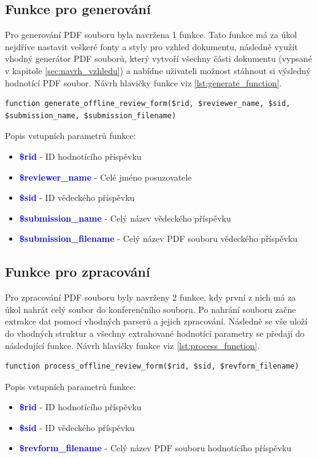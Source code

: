\subsection{Funkce pro generování}
Pro generování PDF souboru byla navržena 1 funkce. Tato funkce má za úkol nejdříve nastavit veškeré fonty a styly pro vzhled dokumentu, následně využít vhodný generátor PDF souborů, který vytvoří všechny části dokumentu (vypsané v kapitole \ref{sec:navrh_vzhledu}) a nabídne uživateli možnost stáhnout si výsledný hodnotící PDF soubor. Návrh hlavičky funkce viz \ref{lst:generate_function}.

\lstset{style=phpstyle}
\begin{lstlisting}[caption = {Návrh hlavičky funkce pro generování PDF souboru}, label = {lst:generate_function}, captionpos=b]
function generate_offline_review_form($rid, $reviewer_name, $sid, $submission_name, $submission_filename)
\end{lstlisting}
Popis vstupních parametrů funkce:
\begin{itemize}
	\item\textcolor{blue}{\textbf{\$rid}} - ID hodnotícího příspěvku
	\item\textcolor{blue}{\textbf{\$reviewer\_name}} - Celé jméno posuzovatele
	\item\textcolor{blue}{\textbf{\$sid}} - ID vědeckého příspěvku
	\item\textcolor{blue}{\textbf{\$submission\_name}} - Celý název vědeckého příspěvku
	\item\textcolor{blue}{\textbf{\$submission\_filename}} - Celý název PDF souboru vědeckého příspěvku
\end{itemize}

\subsection{Funkce pro zpracování}
Pro zpracování  PDF souboru byly navrženy 2 funkce, kdy první z nich má za úkol nahrát celý soubor do konferenčního souboru. Po nahrání souboru začne extrakce dat pomocí vhodných parserů a jejich zpracování. Následně se vše uloží do vhodných struktur a všechny extrahované hodnotící parametry se předají do následující funkce. Návrh hlavičky funkce viz \ref{lst:process_function}.

\begin{lstlisting}[caption = {Návrh hlavičky funkce pro extrakci dat}, label = {lst:process_function}, captionpos=b]
function process_offline_review_form($rid, $sid, $revform_filename)
\end{lstlisting}
Popis vstupních parametrů funkce:
\begin{itemize}
	\item\textcolor{blue}{\textbf{\$rid}} - ID hodnotícího příspěvku
	\item\textcolor{blue}{\textbf{\$sid}} - ID vědeckého příspěvku
	\item\textcolor{blue}{\textbf{\$revform\_filename}} - Celý název PDF souboru hodnotícího příspěvku
\end{itemize}

